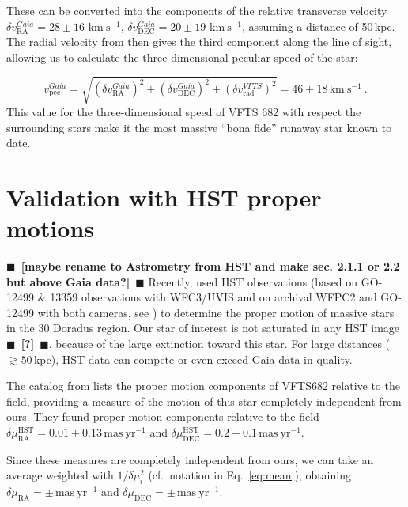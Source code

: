 \documentclass[apjl,twocolumn]{emulateapj}
\newcommand{\todo}[1]{{\large $\blacksquare$~\textbf{\color{red}[#1]}}~$\blacksquare$}
\newcommand{\kms}{{\,\mathrm{km\ s^{-1}}}}
\DeclareRobustCommand{\Eqref}[1]{Eq.~\ref{#1}}
\begin{document}
These can be converted into
the components of the relative transverse velocity $\delta v_\mathrm{RA}^{Gaia}=28\pm16\,\kms$,
$\delta v_\mathrm{DEC}^{Gaia}=20\pm19\,\kms$, assuming a distance of
50\,kpc. %
The radial velocity from
\cite{bestenlehner:11} then gives the third component along
the line of sight, allowing us to calculate the three-dimensional
peculiar speed of the star:

\begin{equation}
  \label{eq:speed_around}
  v_\mathrm{pec}^{Gaia} = \sqrt{\left(\delta v_\mathrm{RA}^{Gaia}\right)^2
    +\left(\delta v_\mathrm{DEC}^{Gaia}\right)^2+\left(\delta
      v_\mathrm{rad}^{VFTS}\right)^2} = 46 \pm 18 
  \kms \ .
\end{equation}
This value for the three-dimensional speed of VFTS 682 with respect the
surrounding stars make it the most massive ``bona fide'' runaway star
known to date.



\section{Validation with HST proper motions}
\todo{maybe rename to Astrometry from HST and make sec. 2.1.1 or 2.2
  but above Gaia data?}
Recently, \citet{platais:18} used HST observations (based on GO-12499
\& 13359 observations with WFC3/UVIS and on archival WFPC2 and
GO-12499 with both cameras, see \citealt{platais:15}) to determine the
proper motion of massive stars in the 30 Doradus region. Our star of
interest is not saturated in any HST image \todo{?},
because of the large extinction toward this star. For
large distances ($\gtrsim50$\,kpc), HST data can compete or even
exceed Gaia data in quality.

The catalog from \citet{platais:18} lists the proper motion
components of VFTS682 relative to the field, providing a
measure of the motion of this star completely independent from
ours. They found proper
motion components relative to the field
$\delta\mu_\mathrm{RA}^\mathrm{HST} = 0.01\pm0.13\,\mathrm{mas\
  yr^{-1}}$ and
$\delta\mu_\mathrm{DEC}^\mathrm{HST}=0.2\pm0.1\,\mathrm{mas\
  yr^{-1}}$.

Since these measures are completely independent from ours, we can take
an average weighted with $1/\delta \mu_i^2$ (cf.~notation in
\Eqref{eq:mean}), obtaining $\delta\mu_\mathrm{RA}=\pm\,\mathrm{mas\
  yr^{-1}}$ and $\delta\mu_\mathrm{DEC}=\pm\,\mathrm{mas\
  yr^{-1}}$.
\end{document}
